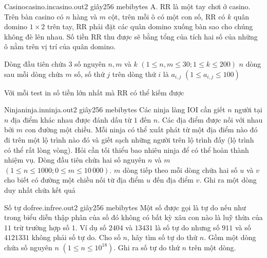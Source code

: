 \documentclass[a4paper,11pt,oneside]{article}
\begin{document}
\begin{problem}{Casino}{casino.in}{casino.out}{2 giây}{256 mebibytes}
A.	RR là một tay chơi ở casino. Trên bàn casino có $n$ hàng và $m$ cột, trên mỗi ô có một con số, RR có $k$ quân domino $1 \times 2$ trên tay, RR phải đặt các quân domino xuống bàn sao cho chúng không đè lên nhau. Số tiền RR thu được sẽ bằng tổng của tích hai số của những ô nằm trên vị trí của quân domino.

\InputFile
Dòng đầu tiên chứa 3 số nguyên $n, m$ và $k$ $(1 \leq n, m \leq 30; 1 \leq k \leq 200)$
$n$ dòng sau mỗi dòng chứa $m$ số, số thứ $j$ trên dòng thứ $i$ là $a_{i, j}$ $(1 \leq a_{i, j} \leq 100)$

\OutputFile
Với mỗi test in số tiền lớn nhất mà RR có thể kiếm được

\Examples
\begin{example}%
\end{example}
\end{problem}

\begin{problem}{Ninja}{ninja.in}{ninja.out}{2 giây}{256 mebibytes}
Các ninja làng IOI cần giết $n$ người tại $n$ địa điểm khác nhau được đánh dấu từ $1$ đến $n$. Các địa điểm được nối với nhau bởi $m$ con đường một chiều. Mỗi ninja có thể xuất phát từ một địa điểm nào đó đi trên một lộ trình nào đó và giết sạch những người trên lộ trình đấy (lộ trình có thể rất lòng vòng). Hỏi cần tối thiểu bao nhiêu ninja để có thể hoàn thành nhiệm vụ.
\InputFile
Dòng đầu tiên chứa hai số nguyên $n$ và $m$ $(1 \leq n \leq 1000; 0 \leq m \leq 10\,000)$. $m$ dòng tiếp theo mỗi dòng chứa hai số $u$ và $v$ cho biết có đường một chiều nối từ địa điểm $u$ đến địa điểm $v$.
\OutputFile
Ghi ra một dòng duy nhất chứa kết quả
\Examples
\begin{example}%
\end{example}
\end{problem}

\begin{problem}{Số tự do}{free.in}{free.out}{2 giây}{256 mebibytes}
Một số được gọi là tự do nếu như trong biểu diễn thập phân của số đó không có bất kỳ xâu con nào là luỹ thừa của $11$ trừ trường hợp số $1$. Ví dụ số $2404$ và $13431$ là số tự do nhưng số $911$ và số $4121331$ không phải số tự do. Cho số $n$, hãy tìm số tự do thứ $n$.
\InputFile
Gồm một dòng chứa số nguyên $n$ $(1 \leq n \leq 10^{18})$.
\OutputFile
Ghi ra số tự do thứ $n$ trên một dòng.
\Examples
\begin{example}%
\end{example}
\end{problem}
\end{document}

